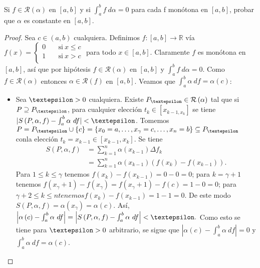 \begin{exercise}
  Si $f\in \mathcal{R}\left(\alpha\right)$ en $\left[a,b\right]$ y si $\int_a^b f\ d\alpha=0$ para cada f monótona en $\left[a,b\right]$, probar que $\alpha$ es constante en $\left[a,b\right]$.
\end{exercise}

\begin{proof}
  Sea $c\in\left(a,b\right)$ cualquiera. Definimos $f:\left[a,b\right]\rightarrow\mathds{R}$ vía
  $f(x)=\begin{cases}
    0 \quad &\text{si}\ x \leq c \\
    1 \quad &\text{si}\ x >c \\
  \end{cases}$
  \quad para todo $x\in\left[a,b\right]$. Claramente $f$ es monótona en $\left[a,b\right]$, así que por hipótesis $f\in\mathcal{R}\left(\alpha\right)$ en $\left[a,b\right]$ y $\int_a^b f\ d\alpha=0$. Como $f\in\mathcal{R}\left(\alpha\right)$ entonces $\alpha\in\mathcal{R}\left(f\right)$ en $\left[a,b\right]$. Veamos que $\int_a^b \alpha\ df = \alpha\left(c\right)$:
  \begin{itemize}
    \item[]Sea $\text{\textepsilon}>0$ cualquiera. Existe $P_{\text{\textepsilon}}\in\mathcal{R}\left(\alpha\right)$ tal que si $P\supseteq P_{\text{\textepsilon}}$, para cualquier elección $t_k\in\left[x_{k-1,x_k}\right]$ se tiene $|S\left(P,\alpha,f\right)-\int_a^b\alpha\ df|<\text{\textepsilon}$. Tomemos $P=P_{\text{\textepsilon}}\cup\left\lbrace c \right\rbrace=\left\lbrace x_0=a,\dots,x_\gamma=c,\dots,x_n=b \right\rbrace\subseteq P_{\text{\textepsilon}}$ conla elección $t_k=x_{k-1}\in\left[x_{k-1},x_k\right]$. Se tiene
    \begin{align*}
      S\left(P,\alpha,f\right)&=\sum_{k=1}^{n}\alpha\left(x_{k-1}\right)\Delta f_k\\
      &=\sum_{k=1}^{n}\alpha\left(x_{k-1}\right)\left(f\left(x_k\right)-f\left(x_{k-1}\right)\right).
    \end{align*}
    Para $1\leq k\leq \gamma$ tenemos $f\left(x_k\right)-f\left(x_{k-1}\right)=0-0=0$; para $k=\gamma +1$ tenemos $f\left(x_\gamma+1\right)-f\left(x_{\gamma}\right)=f\left(x_\gamma+1\right)-f\left(c\right)=1-0=0$; para $\gamma+2\leq k\leq n tenemos f\left(x_k\right)-f\left(x_{k-1}\right)=1-1=0$. De este modo $S\left(P,\alpha,f\right)=\alpha\left(x_\gamma\right)=\alpha\left(c\right)$. Así, $\left|\alpha\left(c\right)-\int_a^b \alpha\ df\right|= \left|S\left(P,\alpha,f\right)-\int_a^b \alpha\ df\right|<\text{\textepsilon}.$ Como esto se tiene para $\text{\textepsilon}>0$ arbitrario, se sigue que $\left|\alpha\left(c\right)-\int_a^b\alpha\ df\right|=0$ y $\int_a^b\alpha\ df=\alpha\left(c\right)$.

\end{itemize}
\end{proof}
